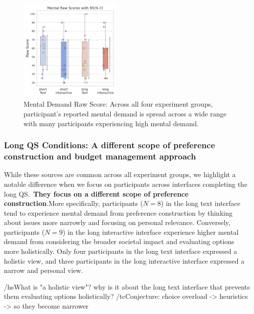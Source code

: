 \begin{figure} %
    \centering
    \includegraphics[width=0.45\textwidth, trim=0 13 0 13, clip]{content/image/cog/Mental_scores.pdf}
    \captionsetup{width=0.40\textwidth, justification=justified} %
    \caption{Mental Demand Raw Score: Across all four experiment groups, participant's reported mental demand is spread across a wide range with many participants experiencing high mental demand.}
    \label{fig:mental_cog_score}
\end{figure}

\subsubsection{Long QS Conditions: A different scope of preference construction and budget management approach}

While these sources are common across all experiment groups, we highlight a notable difference when we focus on participants across interfaces completing the long QS.~\textbf{They focus on a different scope of preference construction}.More specifically, participants ($N=8$) in the long text interface tend to experience mental demand from preference construction by thinking about issues more narrowly and focusing on personal relevance. Conversely, participants ($N=9$) in the long interactive interface experience higher mental demand from considering the broader societal impact and evaluating options more holistically. Only four participants in the long text interface expressed a holistic view, and three participants in the long interactive interface expressed a narrow and personal view.

/hs{What is "a holistic view"? why is it about the long text interface that prevents them evaluating options holistically?}
/tc{Conjecture: choice overload -> heuristics -> so they become narrower}
    
